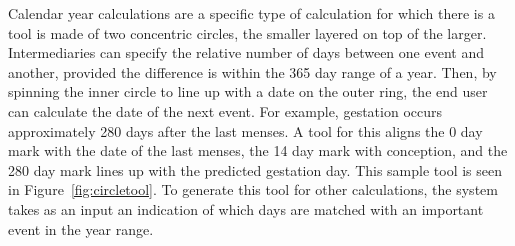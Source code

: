 \documentclass{sig-alternate}
\begin{document}
Calendar year calculations are a specific type of calculation for which there is a tool is made of two concentric circles, the smaller layered on top of the larger. Intermediaries can specify the relative number of days between one event and another, provided the difference is within the 365 day range of a year. Then, by spinning the inner circle to line up with a date on the outer ring, the end user can calculate the date of the next event. For example, gestation occurs approximately 280 days after the last menses. A tool for this aligns the 0 day mark with the date of the last menses, the 14 day mark with conception, and the 280 day mark lines up with the predicted gestation day. This sample tool is seen in Figure~\ref{fig:circletool}. To generate this tool for other calculations, the \nifty system takes as an input an indication of which days are matched with an important event in the year range.


\end{document}

